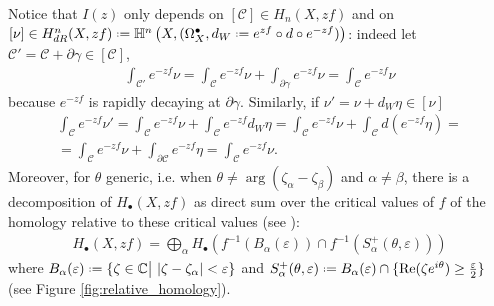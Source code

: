 \documentclass[11pt,a4paper,twoside,leqno,noamsfonts]{amsart}
\numberwithin{equation}{section}
\begin{document}
Notice that $I(z)$ only depends on $[\mathcal{C}]\in H_n(X,zf)$ and on $[\nu]\in H_{dR}^n(X,zf)\defeq\mathbb{H}^n\left(X,(\Omega^\bullet_X,d_W\defeq e^{zf}\circ d\circ e^{-zf})\right)$: indeed let $\mathcal{C}'=\mathcal{C}+\partial\gamma\in [\mathcal{C}]$,
\begin{align*}
\int_{\mathcal{C}'}e^{-zf}\nu=\int_{\mathcal{C}}e^{-zf}\nu+\int_{\partial\gamma}e^{-zf}\nu=\int_{\mathcal{C}}e^{-zf}\nu
\end{align*} 
because $e^{-zf}$ is rapidly decaying at $\partial\gamma$. Similarly, if $\nu'=\nu+d_W\eta\in [\nu]$
\begin{multline*}
\int_{\mathcal{C}}e^{-zf}\nu'=\int_{\mathcal{C}}e^{-zf}\nu+\int_{\mathcal{C}}e^{-zf}d_{W}\eta=\int_{\mathcal{C}}e^{-zf}\nu+\int_{\mathcal{C}}d(e^{-zf}\eta)=\\
=\int_{\mathcal{C}}e^{-zf}\nu+\int_{\partial\mathcal{C}}e^{-zf}\eta=\int_{\mathcal{C}}e^{-zf}\nu.
\end{multline*}
Moreover, for $\theta$ generic, i.e. when $\theta\neq\arg(\zeta_\alpha-\zeta_\beta)$ and $\alpha\neq\beta$, there is a decomposition of $H_\bullet(X,zf)$ as direct sum over the critical values of $f$ of the homology relative to these critical values (see \cite{pham}\cite{KKP}): 
\begin{align}\label{decomposition H_B}
H_\bullet(X,zf)=\bigoplus_{\alpha}H_\bullet\left(f^{-1}(B_\alpha(\varepsilon))\cap f^{-1}(S_\alpha^+(\theta,\varepsilon))\right)
\end{align}     
where $B_\alpha(\varepsilon)\defeq\lbrace \zeta \in\C\big\vert\,\, |\zeta-\zeta_\alpha|<\varepsilon\rbrace$ and $S_\alpha^+(\theta,\varepsilon)\defeq B_\alpha(\varepsilon)\cap\lbrace \mathrm{Re}(\zeta e^{i\theta})\geq \tfrac{\varepsilon}{2}\rbrace$ (see Figure \ref{fig:relative_homology}).
\end{document}
